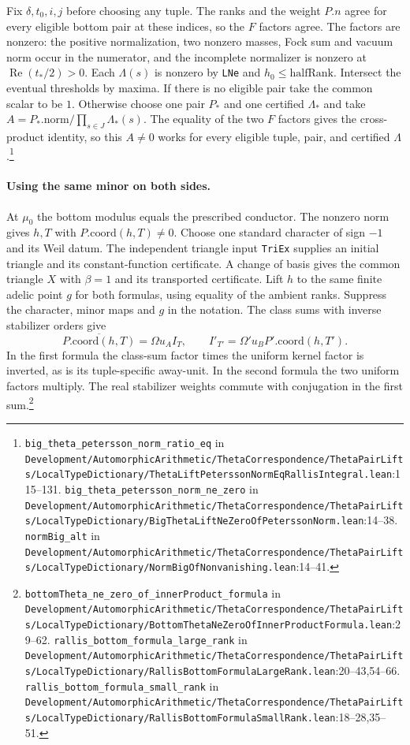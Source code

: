 Fix $\delta,t_0,i,j$ before choosing any tuple. The ranks and the weight $P.n$ agree for every eligible bottom pair at these indices, so the $F$ factors agree. The factors are nonzero: the positive normalization, two nonzero masses, Fock sum and vacuum norm occur in the numerator, and the incomplete normalizer is nonzero at $\operatorname{Re}(t_*/2)>0$. Each $\Lambda(s)$ is nonzero by \nolinkurl{LNe} and $h_0\le\mathrm{halfRank}$. Intersect the eventual thresholds by maxima. If there is no eligible pair take the common scalar to be $1$. Otherwise choose one pair $P_*$ and one certified $\Lambda_*$ and take $A=P_*.\mathrm{norm}/\prod_{s\in J}\Lambda_*(s)$. The equality of the two $F$ factors gives the cross-product identity, so this $A\ne0$ works for every eligible tuple, pair, and certified $\Lambda$.\footnote{\nolinkurl{big_theta_petersson_norm_ratio_eq} in \nolinkurl{Development/AutomorphicArithmetic/ThetaCorrespondence/ThetaPairLifts/LocalTypeDictionary/ThetaLiftPeterssonNormEqRallisIntegral.lean}\allowbreak:115--131. \nolinkurl{big_theta_petersson_norm_ne_zero} in \nolinkurl{Development/AutomorphicArithmetic/ThetaCorrespondence/ThetaPairLifts/LocalTypeDictionary/BigThetaLiftNeZeroOfPeterssonNorm.lean}\allowbreak:14--38. \nolinkurl{normBig_alt} in \nolinkurl{Development/AutomorphicArithmetic/ThetaCorrespondence/ThetaPairLifts/LocalTypeDictionary/NormBigOfNonvanishing.lean}\allowbreak:14--41.}

\paragraph{Using the same minor on both sides.}
At $\mu_0$ the bottom modulus equals the prescribed conductor. The nonzero norm gives $h,T$ with $P.\mathrm{coord}(h,T)\ne0$. Choose one standard character of sign $-1$ and its Weil datum. The independent triangle input \nolinkurl{TriEx} supplies an initial triangle and its constant-function certificate. A change of basis gives the common triangle $X$ with $\beta=1$ and its transported certificate. Lift $h$ to the same finite adelic point $g$ for both formulas, using equality of the ambient ranks. Suppress the character, minor maps and $g$ in the notation. The class sums with inverse stabilizer orders give
\[
 \overline{P.\mathrm{coord}(h,T)}=\Omega u_A I_T,\qquad
 I'_{T'}=\Omega' u_B P'.\mathrm{coord}(h,T').
\]
In the first formula the class-sum factor times the uniform kernel factor is inverted, as is its tuple-specific away-unit. In the second formula the two uniform factors multiply. The real stabilizer weights commute with conjugation in the first sum.\footnote{\nolinkurl{bottomTheta_ne_zero_of_innerProduct_formula} in \nolinkurl{Development/AutomorphicArithmetic/ThetaCorrespondence/ThetaPairLifts/LocalTypeDictionary/BottomThetaNeZeroOfInnerProductFormula.lean}\allowbreak:29--62. \nolinkurl{rallis_bottom_formula_large_rank} in \nolinkurl{Development/AutomorphicArithmetic/ThetaCorrespondence/ThetaPairLifts/LocalTypeDictionary/RallisBottomFormulaLargeRank.lean}\allowbreak:20--43,54--66. \nolinkurl{rallis_bottom_formula_small_rank} in \nolinkurl{Development/AutomorphicArithmetic/ThetaCorrespondence/ThetaPairLifts/LocalTypeDictionary/RallisBottomFormulaSmallRank.lean}\allowbreak:18--28,35--51.}

